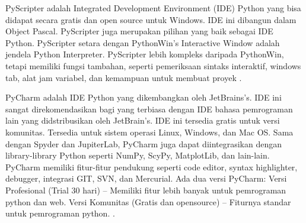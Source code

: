 	PyScripter adalah Integrated Development Environment (IDE) Python yang bisa didapat secara gratis  dan open source untuk Windows. IDE ini dibangun dalam Object Pascal. PyScripter juga merupakan pilihan yang baik sebagai IDE Python. PyScripter setara dengan PythonWin’s Interactive Window adalah jendela Python Interpreter. PyScripter lebih kompleks daripada PythonWin, tetapi memiliki fungsi tambahan, seperti pemeriksaan sintaks interaktif, windows tab, alat jam variabel, dan kemampuan untuk membuat proyek \cite{tateosian2015beginning}.

	PyCharm adalah IDE Python yang dikembangkan oleh JetBrains’s. IDE ini sangat direkomendasikan bagi yang terbiasa dengan IDE bahasa pemrograman lain yang didstribusikan oleh JetBrain’s. IDE ini tersedia gratis untuk versi komunitas. Tersedia untuk sistem operasi Linux, Windows, dan Mac OS. Sama dengan Spyder dan JupiterLab, PyCharm juga dapat diintegrasikan dengan library-library Python seperti NumPy, ScyPy, MatplotLib, dan lain-lain. PyCharm memiliki fitur-fitur pendukung seperti code editor, syntax highlighter, debugger, integrasi GIT, SVN, dan Mercurial.
Ada dua versi PyCharm:
Versi Profesional (Trial 30 hari) – Memiliki fitur lebih banyak untuk pemrograman python dan web.
Versi Komunitas (Gratis dan opensource) – Fiturnya standar untuk pemrograman python. 
\cite{tateosian2015beginning}.

